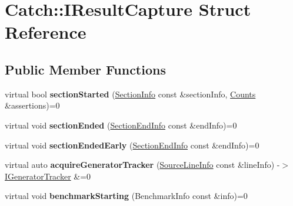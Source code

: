 \hypertarget{struct_catch_1_1_i_result_capture}{}\section{Catch\+:\+:I\+Result\+Capture Struct Reference}
\label{struct_catch_1_1_i_result_capture}
\subsection*{Public Member Functions}
\begin{DoxyCompactItemize}
\item 
\mbox{\label{struct_catch_1_1_i_result_capture_a5b76ed52badcb64cf374202e12b81a03}} 
virtual bool {\bfseries section\+Started} (\mbox{\hyperlink{struct_catch_1_1_section_info}{Section\+Info}} const \&section\+Info, \mbox{\hyperlink{struct_catch_1_1_counts}{Counts}} \&assertions)=0
\item 
\mbox{\label{struct_catch_1_1_i_result_capture_a4e152bc43dc0933684e31fa67a58195d}} 
virtual void {\bfseries section\+Ended} (\mbox{\hyperlink{struct_catch_1_1_section_end_info}{Section\+End\+Info}} const \&end\+Info)=0
\item 
\mbox{\label{struct_catch_1_1_i_result_capture_afcc71eef8ca821ae132cced4a2be6988}} 
virtual void {\bfseries section\+Ended\+Early} (\mbox{\hyperlink{struct_catch_1_1_section_end_info}{Section\+End\+Info}} const \&end\+Info)=0
\item 
\mbox{\label{struct_catch_1_1_i_result_capture_ab020d111e29ad1cabe1227dcfda712ef}} 
virtual auto {\bfseries acquire\+Generator\+Tracker} (\mbox{\hyperlink{struct_catch_1_1_source_line_info}{Source\+Line\+Info}} const \&line\+Info) -\/$>$ \mbox{\hyperlink{struct_catch_1_1_i_generator_tracker}{I\+Generator\+Tracker}} \&=0
\item 
\mbox{\label{struct_catch_1_1_i_result_capture_a264ae12330c74b2daae41715a30d51bf}} 
virtual void {\bfseries benchmark\+Starting} (Benchmark\+Info const \&info)=0
\item 
\mbox{\label{struct_catch_1_1_i_result_capture_a6e5e64f9d94211a888249012ab6cc7fb}} 

\end{DoxyCompactItemize}
